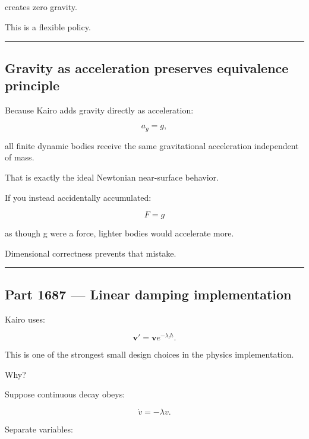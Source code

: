 creates zero gravity.

This is a flexible policy.

\begin{center}\rule{0.5\linewidth}{0.5pt}\end{center}

\subsection{Gravity as acceleration preserves equivalence principle}\label{06-engine-ii-ch038-gravity-as-acceleration-preserves-equivalence-principle}

\hypertarget{06-engine-ii-ch038-gravity-as-acceleration-preserves-equivalence-principle}{}

Because Kairo adds gravity directly as acceleration:

\[
a_g=g,
\]

all finite dynamic bodies receive the same gravitational acceleration independent of mass.

That is exactly the ideal Newtonian near-surface behavior.

If you instead accidentally accumulated:

\[
F=g
\]

as though g were a force, lighter bodies would accelerate more.

Dimensional correctness prevents that mistake.

\begin{center}\rule{0.5\linewidth}{0.5pt}\end{center}

\subsection{Part 1687 --- Linear damping implementation}\label{06-engine-ii-ch038-part-1687-linear-damping-implementation}

\hypertarget{06-engine-ii-ch038-part-1687-linear-damping-implementation}{}

Kairo uses:

\[
\boxed{
\mathbf v'
=
\mathbf v
e^{-\lambda_lh}.
}
\]

This is one of the strongest small design choices in the physics implementation.

Why?

Suppose continuous decay obeys:

\[
\dot v=-\lambda v.
\]

Separate variables:

